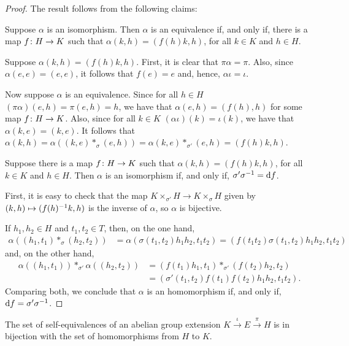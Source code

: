\begin{proof}
	The result follows from the following claims:
	\newclaims
	\begin{claim}
		Suppose $\alpha$ is an isomorphism.
		Then $\alpha$ is an equivalence if, and only if, there is a map $f\colon H \to K$ such that $\alpha(k,h) = (f(h)k, h)$, for all $k\in K$ and $h\in H$.
	\end{claim}

	Suppose $\alpha(k,h) = (f(h)k, h)$.
	First, it is clear that $\pi \alpha = \pi$.
	Also, since $\alpha(e,e) = (e,e)$, it follows that $f(e) = e$ and, hence, $\alpha \iota = \iota$.

	Now suppose $\alpha$ is an equivalence.
	Since for all $h\in H$ $(\pi \alpha) (e, h) = \pi (e, h) = h$, we have that $\alpha (e, h) = (f(h), h)$ for some map $f\colon H\to K$.
	Also, since for all $k\in K$ $(\alpha \iota) (k) = \iota(k)$, we have that $\alpha(k, e) = (k,e)$.
	It follows that $\alpha (k,h) = \alpha((k,e) *_\sigma (e, h)) = \alpha(k, e) *_{\sigma'} (e, h) = (f(h)k, h)$.

	\begin{claim}
		Suppose there is a map $f\colon H \to K$ such that $\alpha(k,h) = (f(h)k, h)$, for all $k\in K$ and $h\in H$.
		Then $\alpha$ is an isomorphism if, and only if, $\sigma'\sigma^{-1} = \mathrm{d}f$.
	\end{claim}

	First, it is easy to check that the map $K \times_{\sigma'} H \to K \times_{\sigma} H$ given by $(k,h)\mapsto (f(h)^{-1} k, h)$ is the inverse of $\alpha$, so $\alpha$ is bijective.

	If $h_1, h_2 \in H$ and $t_1, t_2 \in T$, then, on the one hand,
	\begin{align*}
		\alpha ((h_1, t_1)*_{\sigma}(h_2, t_2) ) & = \alpha (\sigma(t_1, t_2) h_1 h_2, t_1 t_2) =
		( f(t_1 t_2)\sigma(t_1, t_2) h_1 h_2, t_1 t_2)
	\end{align*}
	and, on the other hand,
	\begin{align*}
		\alpha ((h_1, t_1)) *_{\sigma'} \alpha ((h_2, t_2) ) & = ( f(t_1) h_1, t_1) *_{\sigma'} ( f(t_2) h_2, t_2) \\&=
		(\sigma'(t_1, t_2) f(t_1) f(t_2) h_1 h_2, t_1 t_2).
	\end{align*}
	Comparing both, we conclude that $\alpha$ is an homomorphism if, and only if, $\mathrm{d}f = \sigma' \sigma^{-1}$.
\end{proof}

\begin{cor}\label{cor:self-equivalences-are-homomorphisms}
	The set of self-equivalences of an abelian group extension $K \xrightarrow{\iota} E \xrightarrow{\pi} H$ is in bijection with the set of homomorphisms from $H$ to $K$.
\end{cor}

